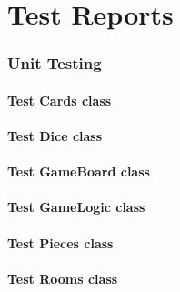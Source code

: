\part{Test Reports}





\section{Unit Testing}

{\small

	\subsection{ Test Cards class}
	

\newpage

	\subsection{ Test Dice class}
	

\newpage

	\subsection{ Test GameBoard class}
	

\newpage

	\subsection{ Test GameLogic class}
	

\newpage

	\subsection{ Test Pieces class }
	

\newpage

	\subsection{ Test Rooms class }
	

}
